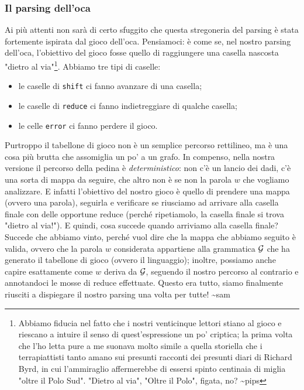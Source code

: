 \documentclass[class=book, crop=false, oneside, 12pt]{standalone}
\begin{document}
\subsubsection{Il parsing dell'oca}
Ai più attenti non sarà di certo sfuggito che questa stregoneria del parsing è stata fortemente ispirata dal gioco dell'oca. Pensiamoci: è come se, nel nostro parsing dell'oca, l'obiettivo del gioco fosse quello di raggiungere una casella nascosta "dietro al via"\footnote{Abbiamo fiducia nel fatto che i nostri venticinque lettori stiano al gioco e riescano a intuire il senso di quest'espressione un po' criptica; la prima volta che l'ho letta pure a me suonava molto simile a quella storiella che i terrapiattisti tanto amano sui presunti racconti dei presunti diari di Richard Byrd, in cui l'ammiraglio affermerebbe di essersi spinto centinaia di miglia "oltre il Polo Sud". "Dietro al via", "Oltre il Polo", figata, no? \textasciitilde pips}. Abbiamo tre tipi di caselle:
\begin{itemize}
    \item le caselle di \texttt{shift} ci fanno avanzare di una casella;
    \item le caselle di \texttt{reduce} ci fanno indietreggiare di qualche casella;
    \item le celle \texttt{error} ci fanno perdere il gioco.
\end{itemize}
Purtroppo il tabellone di gioco non è un semplice percorso rettilineo, ma è una cosa più brutta che assomiglia un po' a un grafo. In compenso, nella nostra versione il percorso della pedina è \emph{deterministico}: non c'è un lancio dei dadi, c'è una sorta di mappa da seguire, che altro non è se non la parola \(w\) che vogliamo analizzare. E infatti l'obiettivo del nostro gioco è quello di prendere una mappa (ovvero una parola), seguirla e verificare se riusciamo ad arrivare alla casella finale con delle opportune reduce (perché ripetiamolo, la casella finale si trova "dietro al via!"). E quindi, cosa succede quando arriviamo alla casella finale? Succede che abbiamo vinto, perché vuol dire che la mappa che abbiamo seguito è valida, ovvero che la parola \(w\) considerata appartiene alla grammatica \(\mathcal{G}\) che ha generato il tabellone di gioco (ovvero il linguaggio); inoltre, possiamo anche capire esattamente come \(w\) deriva da \(\mathcal{G}\), seguendo il nostro percorso al contrario e annotandoci le mosse di reduce effettuate. Questo era tutto, siamo finalmente riusciti a dispiegare il nostro parsing una volta per tutte! \textasciitilde sam
\end{document}
